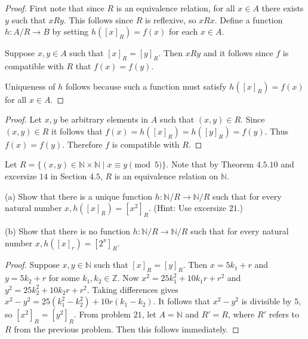 \begin{proof}
    First note that since $R$ is an equivalence relation, 
        for all $x \in A$ there exists $y$ such that $xRy$.
    This follows since $R$ is reflexive, so $xRx$.
    Define a function $h : A / R \rightarrow B$ by setting 
        $h([x]_R) = f(x)$ for each $x \in A$.

    Suppose $x, y \in A$ such that $[x]_R = [y]_R$.
    Then $xRy$ and it follows since $f$ is compatible with $R$ that $f(x) = f(y)$.

    Uniqueness of $h$ follows because such a function must satisfy 
        $h([x]_R) = f(x)$ for all $x \in A$.
\end{proof}

\begin{proof}
    Let $x, y$ be arbitrary elements in $A$
        such that $(x, y) \in R$.
    Since $(x, y) \in R$ it follows that 
        $f(x) = h([x]_R) = h([y]_R) = f(y)$.
    Thus $f(x) = f(y)$.
    Therefore $f$ is compatible with $R$.
\end{proof}

\begin{tcolorbox}[title=Problem 22, breakable]
    Let $R = \{(x, y) \in \mathbb{N} \times \mathbb{N} \mid x \equiv y \pmod{5}\}$.
    Note that by Theorem $4.5.10$ and excersize $14$ in Section $4.5$, $R$ is an 
    equivalence relation on $\mathbb{N}$.

    (a) Show that there is a unique function $h : \mathbb{N} / R \rightarrow \mathbb{N} / R$
        such that for every natural number $x, h([x]_R) = [x^2]_R$. (Hint: Use excersize $21$.)

    (b) Show that there is no function $h : \mathbb{N} / R \rightarrow \mathbb{N} / R$
        such that for every natural number $x, h([x]_r) = [2^x]_R$.
\end{tcolorbox}

\begin{proof}
    Suppose $x, y \in \mathbb{N}$ such that $[x]_R = [y]_R$.
    Then $x = 5k_1 + r$ and $y = 5k_2 + r$ for some $k_1, k_2 \in \mathbb{Z}$.
    Now $x^2 = 25k_1^2 + 10k_1 r + r^2$ and $y^2 = 25k_2^2 + 10k_2 r + r^2$.
    Taking differences gives $x^2 - y^2 = 25(k_1^2 - k_2^2) + 10r(k_1 - k_2)$.
    It follows that $x^2 - y^2$ is divisible by $5$, so $[x^2]_R = [y^2]_R$.
    From problem $21$, let $A = \mathbb{N}$ and $R' = R$,
        where $R'$ refers to $R$ from the previous problem.
    Then this follows immediately.
\end{proof}


